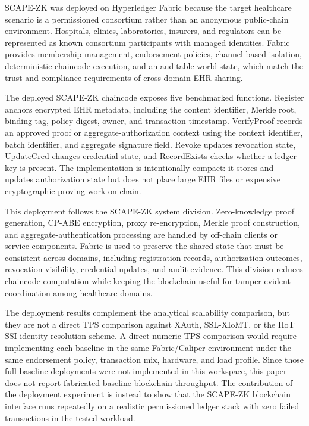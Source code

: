 \documentclass[conference]{IEEEtran}
\begin{document}
SCAPE-ZK was deployed on Hyperledger Fabric because the target healthcare scenario is a permissioned consortium rather than an anonymous public-chain environment. Hospitals, clinics, laboratories, insurers, and regulators can be represented as known consortium participants with managed identities. Fabric provides membership management, endorsement policies, channel-based isolation, deterministic chaincode execution, and an auditable world state, which match the trust and compliance requirements of cross-domain EHR sharing.

The deployed SCAPE-ZK chaincode exposes five benchmarked functions. Register anchors encrypted EHR metadata, including the content identifier, Merkle root, binding tag, policy digest, owner, and transaction timestamp. VerifyProof records an approved proof or aggregate-authorization context using the context identifier, batch identifier, and aggregate signature field. Revoke updates revocation state, UpdateCred changes credential state, and RecordExists checks whether a ledger key is present. The implementation is intentionally compact: it stores and updates authorization state but does not place large EHR files or expensive cryptographic proving work on-chain.

This deployment follows the SCAPE-ZK system division. Zero-knowledge proof generation, CP-ABE encryption, proxy re-encryption, Merkle proof construction, and aggregate-authentication processing are handled by off-chain clients or service components. Fabric is used to preserve the shared state that must be consistent across domains, including registration records, authorization outcomes, revocation visibility, credential updates, and audit evidence. This division reduces chaincode computation while keeping the blockchain useful for tamper-evident coordination among healthcare domains.

The deployment results complement the analytical scalability comparison, but they are not a direct TPS comparison against XAuth, SSL-XIoMT, or the IIoT SSI identity-resolution scheme. A direct numeric TPS comparison would require implementing each baseline in the same Fabric/Caliper environment under the same endorsement policy, transaction mix, hardware, and load profile. Since those full baseline deployments were not implemented in this workspace, this paper does not report fabricated baseline blockchain throughput. The contribution of the deployment experiment is instead to show that the SCAPE-ZK blockchain interface runs repeatedly on a realistic permissioned ledger stack with zero failed transactions in the tested workload.
\end{document}
